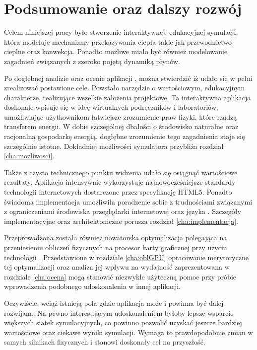 \chapter{Podsumowanie oraz dalszy rozwój}

Celem niniejszej pracy było stworzenie interaktywnej, edukacyjnej symulacji,
która modeluje mechanizmy przekazywania ciepła takie jak przewodnictwo cieplne
oraz konwekcja. Ponadto możliwe miało być również modelowanie zagadnień
związanych z szeroko pojętą dynamiką płynów.

Po dogłębnej analizie oraz ocenie aplikacji \en, można stwierdzić iż udało się w
pełni zrealizować postawione cele. Powstało narzędzie o wartościowym,
edukacyjnym charakterze, realizujące wszelkie założenia projektowe. Ta
interaktywna aplikacja doskonale wpisuje się w ideę wirtualnych podręczników i
laboratoriów, umożliwiając użytkownikom łatwiejsze zrozumienie praw fizyki,
które rządzą transferem energii. W dobie szczególnej dbałości o środowisko
naturalne oraz racjonalną gospodarkę energią, dogłębne zrozumienie tego
zagadnienia staje się szczególnie istotne. Dokładniej możliwości symulatora
przybliża rozdział \ref{cha:mozliwosci}.

Także z czysto technicznego punktu widzenia udało się osiągnąć wartościowe
rezultaty. Aplikacja intensywnie wykorzystuje najnowocześniejsze standardy
technologii internetowych dostarczone przez specyfikację HTML5. Ponadto
świadoma implementacja umożliwiła poradzenie sobie z trudnościami związanymi z
ograniczeniami środowiska przeglądarki internetowej oraz języka \js. Szczegóły
implementacyjne oraz architektoniczne porusza rozdział \ref{cha:implementacja}.

Przeprowadzona została również nowatorska optymalizacja polegająca na
przeniesieniu obliczeń fizycznych na procesor karty graficznej przy użyciu
technologii . Przedstawione w rozdziale \ref{cha:oblGPU} opracowanie
merytoryczne tej optymalizacji oraz analiza jej wpływu na wydajność
zaprezentowana w rozdziale \ref{cha:ocena} mogą stanowić niezwykle użyteczną
pomoc przy próbie wprowadzenia podobnego udoskonalenia w innej aplikacji.

Oczywiście, wciąż istnieją pola gdzie aplikacja może i powinna być dalej
rozwijana. Na pewno interesującym udoskonaleniem byłoby lepsze wsparcie większych
siatek symulacyjnych, co powinno pozwolić uzyskać jeszcze bardziej wartościowe
oraz ciekawe wyniki symulacji. Wymaga to prawdopodobnie zmian w samych
silnikach fizycznych i stanowi doskonały cel na przyszłość.

